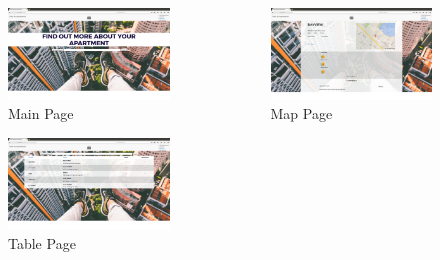 \documentclass[final]{beamer}
\newlength{\onecolwid}
\newlength{\twocolwid}
\begin{document}
\begin{frame}[t]
\begin{columns}[t]
\begin{column}{\twocolwid}
\begin{columns}[t,totalwidth=\twocolwid] %

\begin{column}{\onecolwid} %


\begin{figure}
\includegraphics[height=0.5\linewidth]{mainpage.png}
\caption{Main Page}
\end{figure}

\begin{figure}
\includegraphics[height=0.5\linewidth]{table.png}
\caption{Table Page}
\end{figure}


\end{column} %

\begin{column}{\onecolwid} %


\begin{figure}
\includegraphics[height=0.5\linewidth]{map.png}
\caption{Map Page}
\end{figure}


\end{column}
\end{columns}
\end{column}
\end{columns}
\end{frame}
\end{document}
